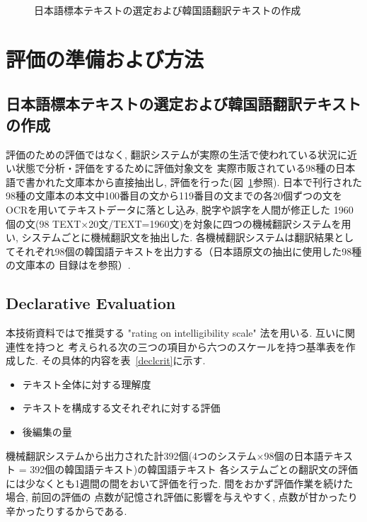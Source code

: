\begin{figure}
\begin{center}
\caption{\label{japantext}日本語標本テキストの選定および韓国語翻訳テキストの作成}
\end{center}
\end{figure}

\section{評価の準備および方法}
\subsection{日本語標本テキストの選定および韓国語翻訳テキストの作成}
評価のための評価ではなく, 翻訳システムが実際の生活で使われている状況に近い状態で分析・評価をするために評価対象文を
実際市販されている98種の日本語で書かれた文庫本から直接抽出し, 評価を行った(図~\ref{japantext}参照). 
日本で刊行された98種の文庫本の本文中100番目の文から119番目の文までの各20個ずつの文をOCRを用いてテキストデータに落とし込み, 脱字や誤字を人間が修正した
1960個の文(98 TEXT×20文/TEXT=1960文)を対象に四つの機械翻訳システムを用い, システムごとに機械翻訳文を抽出した. 
各機械翻訳システムは翻訳結果としてそれぞれ98個の韓国語テキストを出力する（日本語原文の抽出に使用した98種の文庫本の
目録は\cite{choiandkim}を参照）. 

\subsection{Declarative Evaluation}
本技術資料では\cite{dijk}で推奨する "rating on intelligibility scale" 法を用いる. 互いに関連性を持つと
考えられる次の三つの項目から六つのスケールを持つ基準表を作成した.  その具体的内容を表~\ref{declcrit}に示す. 

\vspace{0.3cm}

\begin{itemize}
\item テキスト全体に対する理解度
\item テキストを構成する文それぞれに対する評価
\item 後編集の量
\end{itemize}

\vspace{0.5cm}

機械翻訳システムから出力された計392個(4つのシステム×98個の日本語テキスト = 392個の韓国語テキスト)の韓国語テキスト
各システムごとの翻訳文の評価には少なくとも1週間の間をおいて評価を行った. 間をおかず評価作業を続けた場合, 前回の評価の
点数が記憶され評価に影響を与えやすく, 点数が甘かったり辛かったりするからである. 

